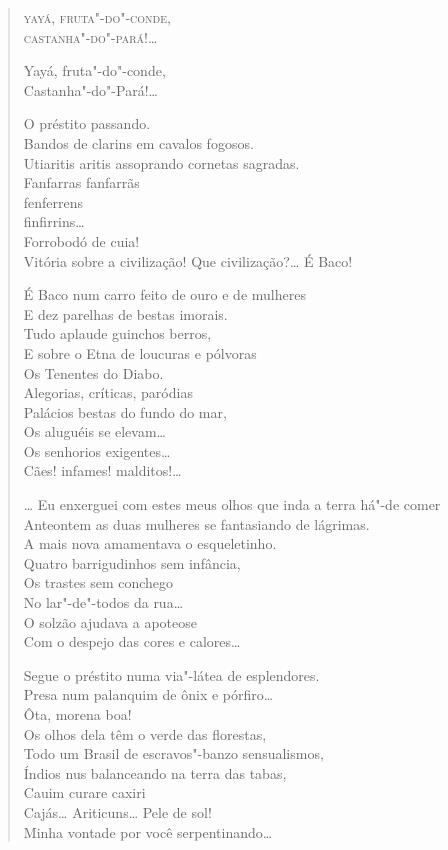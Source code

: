 \begin{verse}
\quad\quad\quad\quad\quad{}\textsc{yayá, fruta"-do"-conde},\\
\quad\quad\quad\quad\quad{}\textsc{castanha"-do"-pará!}\ldots{}

\quad\quad\quad\quad\quad\quad\quad{}Yayá, fruta"-do"-conde,\\
\quad\quad\quad\quad\quad\quad\quad{}Castanha"-do"-Pará!\ldots{}

O préstito passando.\\
Bandos de clarins em cavalos fogosos.\\
Utiaritis aritis assoprando cornetas sagradas.\\
Fanfarras fanfarrãs\\
\quad\quad\quad{}fenferrens\\
\quad\quad\quad\quad{}finfirrins\ldots{}\\
\quad\quad\quad\quad\quad{}Forrobodó de cuia!\\
Vitória sobre a civilização! Que civilização?\ldots{} É Baco!

É Baco num carro feito de ouro e de mulheres\\
E dez parelhas de bestas imorais.\\
Tudo aplaude guinchos berros,\\
E sobre o Etna de loucuras e pólvoras\\
Os Tenentes do Diabo.\\
Alegorias, críticas, paródias\\
Palácios bestas do fundo do mar,\\
Os aluguéis se elevam\ldots{}\\
\quad{}Os senhorios exigentes\ldots{}\\
\quad\quad{}Cães! infames! malditos!\ldots{}

\ldots{} Eu enxerguei com estes meus olhos que inda a terra há"-de comer\\
Anteontem as duas mulheres se fantasiando de lágrimas.\\
A mais nova amamentava o esqueletinho.\\
Quatro barrigudinhos sem infância,\\
Os trastes sem conchego\\
No lar"-de"-todos da rua\ldots{}\\
O solzão ajudava a apoteose\\
Com o despejo das cores e calores\ldots{}

Segue o préstito numa via"-látea de esplendores.\\
Presa num palanquim de ônix e pórfiro\ldots{}\\
Ôta, morena boa!\\
Os olhos dela têm o verde das florestas,\\
Todo um Brasil de escravos"-banzo sensualismos,\\
Índios nus balanceando na terra das tabas,\\
Cauim curare caxiri\\
Cajás\ldots{} Ariticuns\ldots{} Pele de sol!\\
Minha vontade por você serpentinando\ldots{}


\end{verse}
